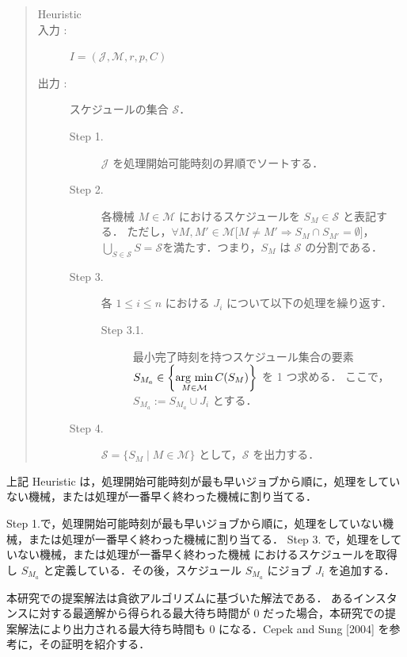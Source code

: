 \documentclass[12pt]{optlab-bachelor}
\newcommand{\argmin}{\mathop{\rm arg~min}\limits}
\begin{document}
\begin{quote}
  \begin{description}
    \item[{\sc Heuristic}]
    \item[入力 :] $I = (\mathcal{J}, \mathcal{M},r,p,C)$
    \item[出力 :] スケジュールの集合 $\mathcal{S}$．
    \begin{description}
      \item[Step 1.]
      $\mathcal{J}$ を処理開始可能時刻の昇順でソートする．
      \item[Step 2.]
      各機械 $M \in \mathcal{M}$ におけるスケジュールを $S_M \in \mathcal{S}$ と表記する．
      ただし，$\forall M, M' \in \mathcal{M}\big[M \neq M' \Rightarrow S_M \cap S_{M'} = \emptyset \big]$，$\displaystyle \bigcup_{S \in \mathcal{S}}S = \mathcal{S}$を満たす．つまり，$S_M$ は $\mathcal{S}$ の分割である．
      \item[Step 3.]
      各 $1 \le i \le n$ における $J_i$ について以下の処理を繰り返す．
      \begin{description}
        \item[Step 3.1.]
        最小完了時刻を持つスケジュール集合の要素 $S_{M_a} \in \left\{ \displaystyle \argmin_{M \in \mathcal{M}}C(S_M)\right\}$ を 1 つ求める．
        ここで，$S_{M_a} := S_{M_a} \cup J_i$ とする．
      \end{description}
      \item[Step 4.]
      $\mathcal{S} = \{ S_M \mid M \in \mathcal{M}\}$ として，$\mathcal{S}$ を出力する．
    \end{description}
  \end{description}
\end{quote}

上記 {\sc Heuristic} は，処理開始可能時刻が最も早いジョブから順に，処理をしていない機械，または処理が一番早く終わった機械に割り当てる．

Step 1.で，処理開始可能時刻が最も早いジョブから順に，処理をしていない機械，または処理が一番早く終わった機械に割り当てる．
Step 3. で，処理をしていない機械，または処理が一番早く終わった機械 におけるスケジュールを取得し $S_{M_a}$ と定義している．その後，スケジュール $S_{M_a}$ にジョブ $J_i$ を追加する．

本研究での提案解法は貪欲アルゴリズムに基づいた解法である．
あるインスタンスに対する最適解から得られる最大待ち時間が 0 だった場合，本研究での提案解法により出力される最大待ち時間も 0 になる．Cepek and Sung [2004] \cite{JIT} を参考に，その証明を紹介する．
\end{document}
